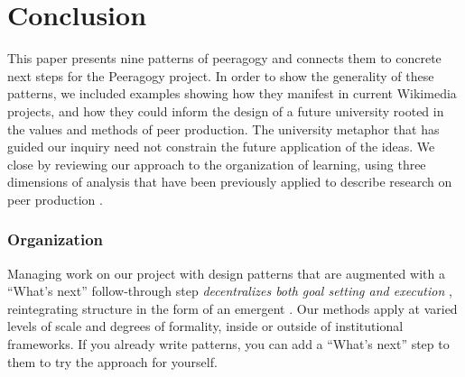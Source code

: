 \section{Conclusion}\label{sec:Conclusion}



This paper presents nine patterns of peeragogy and connects them to
concrete next steps for the Peeragogy project.  In order to
show the generality of these patterns, we included examples
showing how they manifest in current Wikimedia projects, and 
how they could inform the design of a future university rooted in the
values and methods of peer production.
%
%
The university metaphor that has guided our inquiry need not
constrain the future application of the ideas.
%
We close by reviewing our approach to the organization of learning,
using three dimensions of analysis that have been previously applied to describe
research on peer production \cite{benkler2015peer}.

\vspace{-.25\baselineskip}

\subsubsection*{Organization} 
Managing work on our project with design patterns that are augmented
with a ``What's next'' follow-through step \emph{decentralizes both
  goal setting and execution} \cite{benkler2015peer}, reintegrating
structure in the form of an emergent .  Our
methods apply at varied levels of scale and degrees of formality,
inside or outside of institutional frameworks.  If you already write
patterns, you can add a ``What's next'' step to them to try the
approach for yourself.

